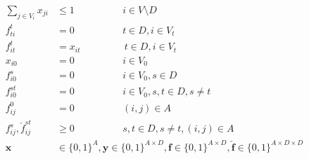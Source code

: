 \begin{subequations}
\begin{flalign}
\label{con:pf2:B}  \sum_{j\in V_i}x_{ji}&\leq 1~~~~ \qquad  \qquad i\in V\setminus D\\
\label{con:pf2:noflowFromT} f_{ti}^t&=0 ~~~~ \qquad  \qquad t\in D, i\in V_t   \\
\label{con:pf2:fitt=xit} f_{it}^t&=x_{it} ~~ \qquad  \qquad t\in D, i\in V_t \\
\label{con:pf2:xi0=0} x_{i0}&=0 ~~~~ \qquad  \qquad i\in V_0 \\
\label{con:pf2:fi0s=0} f_{i0}^s&=0 ~~~~ \qquad  \qquad i\in V_0, s\in D \\
\label{con:pf2:fi0st=0} f_{i0}^{st}&=0 ~~~~ \qquad  \qquad i\in V_0, s,t\in D, s\neq t \\
\label{con:pf2:fij0=0} f_{ij}^0&=0 ~~~~ \qquad  \qquad (i,j)\in A \\
		 			  \label{con:pf2:dim1}  f^s_{ij},\check{f}^{st}_{ij}    & \geq 0    ~~~~ \qquad \qquad	 s,t\in D,s\neq t,(i,j)\in A \\			   			  
 \label{con:pf2:dim2}  \mathbf{x}    & \in \{0,1\}^A ,\mathbf{y}  \in \{0,1\}^{A\times D}, \mathbf{f}\in \{0,1\}^{A\times D}, \mathbf{\check{f}}\in\{0,1\}^{A\times D\times D}
    \end{flalign}~
    \end{subequations}
    
